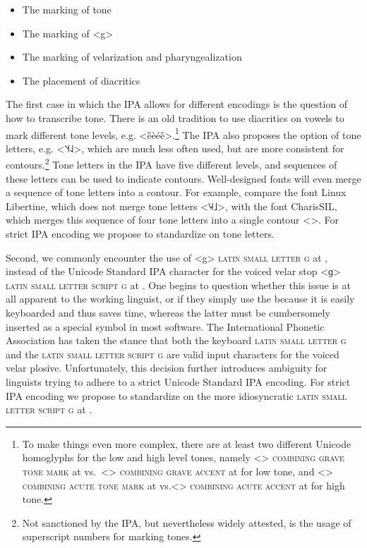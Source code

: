 \begin{itemize}
  \item The marking of tone
  \item The marking of <g>
  \item The marking of velarization and pharyngealization
  \item The placement of diacritics
\end{itemize}

The first case in which the IPA allows for different encodings is the question
of how to transcribe tone. There is an old tradition to use diacritics on vowels
to mark different tone levels, e.g. <ȅèée̋>.\footnote{To make things even more
complex, there are at least two different Unicode homoglyphs for the low and
high level tones, namely <> \textsc{combining grave tone mark} at
 vs.~<> \textsc{combining grave accent} at  for
low tone, and <> \textsc{combining acute tone mark} at 
vs.<> \textsc{combining acute accent} at  for high tone.}
The IPA also proposes the option of tone letters, e.g. <˥˦˧˨˩>, which are much
less often used, but are more consistent for contours.\footnote{Not sanctioned
by the IPA, but nevertheless widely attested, is the usage of superscript
numbers for marking tones.} Tone letters in the IPA have five different levels,
and sequences of these letters can be used to indicate contours. Well-designed
fonts will even merge a sequence of tone letters into a contour. For example,
compare the font Linux Libertine, which does not merge tone letters
<{˥˨˧˩}>, with the font CharisSIL, which merges this
sequence of four tone letters into a single contour <>. For strict
IPA encoding we propose to standardize on tone letters.


Second, we commonly encounter the use of <g> \textsc{latin small letter g} at
, instead of the Unicode Standard IPA character for the voiced velar
stop <ɡ> \textsc{latin small letter script g} at . One begins to
question whether this issue is at all apparent to the working linguist, or if
they simply use the  because it is easily keyboarded and thus saves
time, whereas the latter must be cumbersomely inserted as a special symbol in
most software. The International Phonetic Association has taken the stance that
both the keyboard \textsc{latin small letter g} and the \textsc{latin small
letter script g} are valid input characters for the voiced velar plosive.
Unfortunately, this decision further introduces ambiguity for linguists trying
to adhere to a strict Unicode Standard IPA encoding. For strict IPA encoding we
propose to standardize on the more idiosyncratic \textsc{latin small letter
script g} at .

